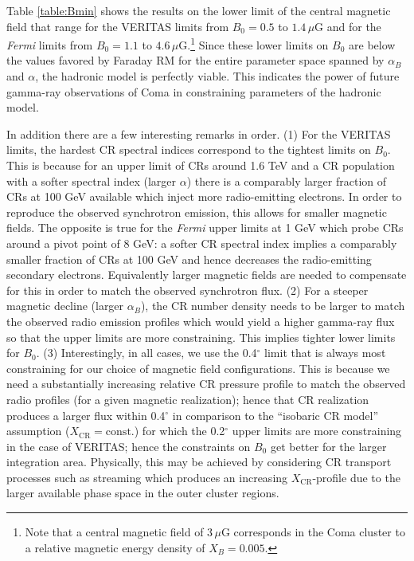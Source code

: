 \documentclass[12pt,manuscript]{aastex}
\newcommand{\rmn}{\mathrm}
\newcommand{\CR}{\mathrm{CR}}
\begin{document}
Table \ref{table:Bmin} shows the results on the lower limit of the central magnetic field that
range for the VERITAS limits from $B_{0} = 0.5$ to $1.4\,\mu$G and for the {\em Fermi} limits from
$B_{0} = 1.1$ to $4.6\,\mu$G.\footnote{Note that a central magnetic field of $3\,\mu$G corresponds
in the Coma cluster to a relative magnetic energy density of $X_B=0.005$.} Since these lower limits
on $B_0$ are below the values favored by Faraday RM for the entire parameter space spanned by
$\alpha_B$ and $\alpha$, the hadronic model is perfectly viable.  This indicates the power of
future gamma-ray observations of Coma in constraining parameters of the hadronic model.

In addition there are a few interesting remarks in order. (1) For the VERITAS limits, the hardest
CR spectral indices correspond to the tightest limits on $B_0$. This is because for an upper limit
of CRs around 1.6 TeV and a CR population with a softer spectral index (larger $\alpha$) there is a
comparably larger fraction of CRs at 100 GeV available which inject more radio-emitting electrons.
In order to reproduce the observed synchrotron emission, this allows for smaller magnetic fields.
The opposite is true for the {\em Fermi} upper limits at 1 GeV which probe CRs around a pivot point
of 8 GeV: a softer CR spectral index implies a comparably smaller fraction of CRs at 100 GeV and
hence decreases the radio-emitting secondary electrons. Equivalently larger magnetic fields are
needed to compensate for this in order to match the observed synchrotron flux.  (2) For a steeper
magnetic decline (larger $\alpha_{B}$), the CR number density needs to be larger to match the
observed radio emission profiles which would yield a higher gamma-ray flux so that the upper limits
are more constraining. This implies tighter lower limits for $B_{0}$.  (3) Interestingly, in all
cases, we use the 0.4$^{\circ}$ limit that is always most constraining for our choice of magnetic
field configurations.  This is because we need a substantially increasing relative CR pressure
profile to match the observed radio profiles (for a given magnetic realization); hence that CR
realization produces a larger flux within 0.4$^{\circ}$ in comparison to the ``isobaric CR model''
assumption ($X_{\CR} = \rmn{const.}$) for which the 0.2$^{\circ}$ upper limits are more
constraining in the case of VERITAS; hence the constraints on $B_{0}$ get better for the larger
integration area. Physically, this may be achieved by considering CR transport processes such as
streaming which produces an increasing $X_{\CR}$-profile due to the larger available phase space in
the outer cluster regions.
\end{document}
